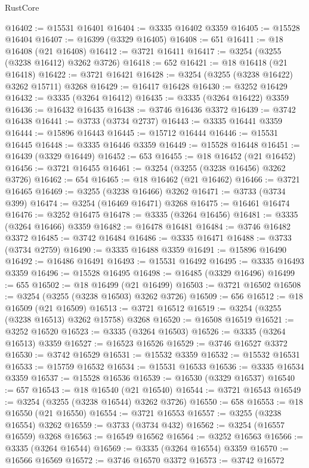 \begin{lexlean}{RustCore}
\begin{coremodule}
@16402 := @15531 @16401
@16404 := @3335 @16402 @3359
@16405 := @15528 @16404
@16407 := @16399 (@3329 @16405)
@16408 := 651
@16411 := @18 @16408 (@21 @16408)
@16412 := @3721 @16411
@16417 := @3254 (@3255 (@3238 @16412) @3262 @3726)
@16418 := 652
@16421 := @18 @16418 (@21 @16418)
@16422 := @3721 @16421
@16428 := @3254 (@3255 (@3238 @16422) @3262 @15711) @3268
@16429 := @16417 @16428
@16430 := @3252 @16429
@16432 := @3335 (@3264 @16412)
@16435 := @3335 (@3264 @16422) @3359
@16436 := @16432 @16435
@16438 := @3746 @16436 @3372
@16439 := @3742 @16438
@16441 := @3733 (@3734 @2737)
@16443 := @3335 @16441 @3359
@16444 := @15896 @16443
@16445 := @15712 @16444
@16446 := @15531 @16445
@16448 := @3335 @16446 @3359
@16449 := @15528 @16448
@16451 := @16439 (@3329 @16449)
@16452 := 653
@16455 := @18 @16452 (@21 @16452)
@16456 := @3721 @16455
@16461 := @3254 (@3255 (@3238 @16456) @3262 @3726)
@16462 := 654
@16465 := @18 @16462 (@21 @16462)
@16466 := @3721 @16465
@16469 := @3255 (@3238 @16466) @3262
@16471 := @3733 (@3734 @399)
@16474 := @3254 (@16469 @16471) @3268
@16475 := @16461 @16474
@16476 := @3252 @16475
@16478 := @3335 (@3264 @16456)
@16481 := @3335 (@3264 @16466) @3359
@16482 := @16478 @16481
@16484 := @3746 @16482 @3372
@16485 := @3742 @16484
@16486 := @3335 @16471
@16488 := @3733 (@3734 @2759)
@16490 := @3335 @16488 @3359
@16491 := @15896 @16490
@16492 := @16486 @16491
@16493 := @15531 @16492
@16495 := @3335 @16493 @3359
@16496 := @15528 @16495
@16498 := @16485 (@3329 @16496)
@16499 := 655
@16502 := @18 @16499 (@21 @16499)
@16503 := @3721 @16502
@16508 := @3254 (@3255 (@3238 @16503) @3262 @3726)
@16509 := 656
@16512 := @18 @16509 (@21 @16509)
@16513 := @3721 @16512
@16519 := @3254 (@3255 (@3238 @16513) @3262 @15758) @3268
@16520 := @16508 @16519
@16521 := @3252 @16520
@16523 := @3335 (@3264 @16503)
@16526 := @3335 (@3264 @16513) @3359
@16527 := @16523 @16526
@16529 := @3746 @16527 @3372
@16530 := @3742 @16529
@16531 := @15532 @3359
@16532 := @15532 @16531
@16533 := @15759 @16532
@16534 := @15531 @16533
@16536 := @3335 @16534 @3359
@16537 := @15528 @16536
@16539 := @16530 (@3329 @16537)
@16540 := 657
@16543 := @18 @16540 (@21 @16540)
@16544 := @3721 @16543
@16549 := @3254 (@3255 (@3238 @16544) @3262 @3726)
@16550 := 658
@16553 := @18 @16550 (@21 @16550)
@16554 := @3721 @16553
@16557 := @3255 (@3238 @16554) @3262
@16559 := @3733 (@3734 @432)
@16562 := @3254 (@16557 @16559) @3268
@16563 := @16549 @16562
@16564 := @3252 @16563
@16566 := @3335 (@3264 @16544)
@16569 := @3335 (@3264 @16554) @3359
@16570 := @16566 @16569
@16572 := @3746 @16570 @3372
@16573 := @3742 @16572

\end{coremodule}
\end{lexlean}
